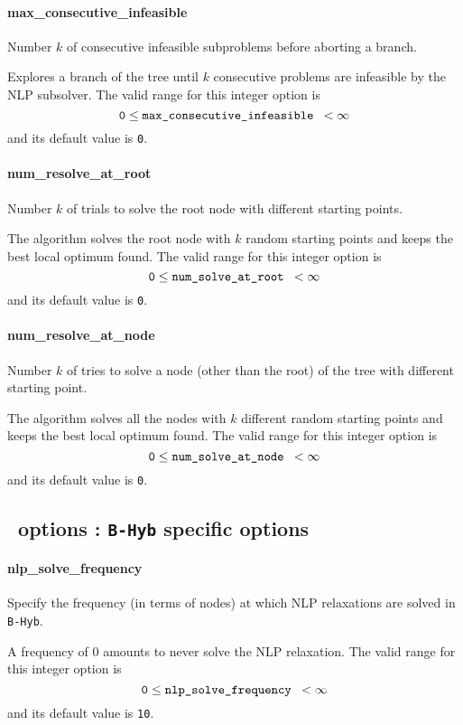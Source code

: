 \paragraph{max\_consecutive\_infeasible}
Number $k$ of consecutive infeasible subproblems before aborting a branch.

 Explores a branch of the tree
      until $k$ consecutive
problems are infeasible by the NLP subsolver. The valid range for
this integer option is
$${\tt 0} \le \hbox{\tt max\_consecutive\_infeasible } <  \infty$$
and its default value is {\tt 0}.


\paragraph{num\_resolve\_at\_root}
Number $k$ of trials to solve the root node with different starting points.

 The algorithm solves the root node with $k$
random starting points and keeps the best
local optimum found. The valid range for this integer option is
$${\tt 0} \le \hbox{\tt num\_solve\_at\_root } <  \infty $$
and its default value is {\tt 0}.


\paragraph{num\_resolve\_at\_node}
Number $k$ of tries to solve a node (other than the root) of the tree with different starting point.

 The algorithm solves all the nodes with $k$
different random starting points and keeps
the best local optimum found. The valid range for this integer option is
$${\tt 0} \le \hbox{\tt num\_solve\_at\_node } <  \infty$$
and its default value is {\tt 0}.



\subsection{\Bonmin\ options : {\tt B-Hyb} specific options}

\paragraph{nlp\_solve\_frequency}
Specify the frequency (in terms of nodes) at which NLP relaxations
are solved in {\tt B-Hyb}.

 A frequency of 0 amounts to never solve the
NLP relaxation. The valid range for this integer option is
$${\tt 0} \le \hbox{\tt nlp\_solve\_frequency } <  \infty$$
and its default value is {\tt 10}.


